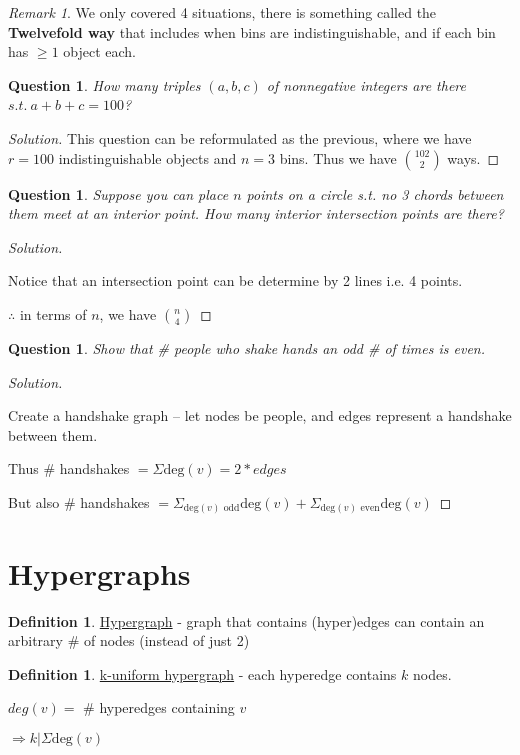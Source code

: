 \documentclass[psamsfonts, 12pt]{amsart}
\newtheorem{quest}[thm]{Question}
\theoremstyle{definition}
\newtheorem{defn}[thm]{Definition}
\theoremstyle{remark}
\newtheorem*{rem*}{Remark}
\newenvironment{solution}
  {\begin{proof}[Solution]}
  {\end{proof}}
\begin{document}
\begin{rem*}
We only covered 4 situations, there is something called the \textbf{Twelvefold way} that includes when bins are indistinguishable, and if each bin has $\geq 1$ object each.
\end{rem*}

\begin{quest}
How many triples $(a,b,c)$ of nonnegative integers are there $s.t.\ a+b+c=100$?
\end{quest}

\begin{solution}

This question can be reformulated as the previous, where we have $r=100$ indistinguishable objects and $n=3$ bins. Thus we have $102\choose2$ ways.
\end{solution}

\begin{quest}
Suppose you can place $n$ points on a circle s.t. no 3 chords between them meet at an interior point. How many interior intersection points are there?
\end{quest}

\begin{solution} \
\vspace{0.5em}

Notice that an intersection point can be determine by 2 lines i.e. 4 points.

$\therefore$ in terms of $n$, we have $n\choose4$
\end{solution}

\begin{quest}
Show that \# people who shake hands an odd \# of times is even.
\end{quest}

\begin{solution}
\ \vspace{0.5em}

Create a handshake graph -- let nodes be people, and edges represent a handshake between them.

Thus \# handshakes $= \Sigma \text{deg}(v) = 2*edges$

But also $\#$ handshakes $= \Sigma_{\text{deg}(v) \text{ odd}} \text{deg}(v) + \Sigma_{\text{deg}(v) \text{ even}} \text{deg}(v)$
\end{solution}

\section{Hypergraphs}
\begin{defn}
\underline{Hypergraph} - graph that contains (hyper)edges can contain an arbitrary \# of nodes (instead of just 2)
\end{defn}

\begin{defn}
\underline{k-uniform hypergraph} - each hyperedge contains $k$ nodes.

$deg(v) = $ \# hyperedges containing $v$

$\Rightarrow k | \Sigma\text{deg}(v)$
\end{defn}
\end{document}
